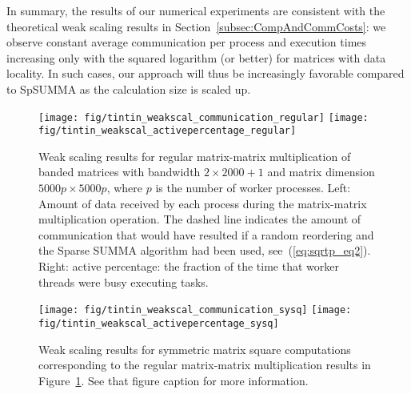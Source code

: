 \documentclass{elsarticle}
\begin{document}
In summary, the results of our numerical experiments are consistent
with the theoretical weak scaling results in
Section~\ref{subsec:CompAndCommCosts}: we observe constant average
communication per process and execution times increasing only with the
squared logarithm (or better) for matrices with data locality.  In
such cases, our approach will thus be increasingly favorable compared
to SpSUMMA as the calculation size is scaled up.







\begin{figure}
  \begin{center}
    \texttt{[image: fig/tintin\_weakscal\_communication\_regular]}
    \texttt{[image: fig/tintin\_weakscal\_activepercentage\_regular]}
  \end{center}
  \caption{Weak scaling results for regular matrix-matrix
    multiplication of banded matrices with bandwidth $2 \times 2000+1$
    and matrix dimension $5000p \times 5000p$, where $p$ is the number
    of worker processes. Left: Amount of data received
    by each process during the matrix-matrix multiplication
    operation. The dashed line indicates the amount of communication
    that would have resulted if a random reordering and the Sparse
    SUMMA algorithm had been used, see~(\ref{eq:sqrtp_eq2}).
    Right: active percentage: the fraction of the time that worker
    threads were busy executing tasks.
    \label{fig:tintin_weakscal_regular}}
\end{figure}

\begin{figure}
  \begin{center}
    \texttt{[image: fig/tintin\_weakscal\_communication\_sysq]}
    \texttt{[image: fig/tintin\_weakscal\_activepercentage\_sysq]}
  \end{center}
  \caption{Weak scaling results for symmetric matrix square
    computations corresponding to the regular matrix-matrix
    multiplication results in
    Figure~\ref{fig:tintin_weakscal_regular}. See that figure caption
    for more information.
    \label{fig:tintin_weakscal_sysq}}
\end{figure}
\end{document}
